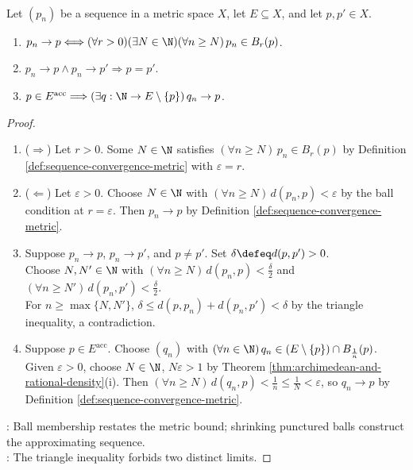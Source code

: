 \begin{theorem} \label{thm:metric-sequence-basic-properties} \\
Let $(p_n)$ be a sequence in a metric space $X$, let $E\subseteq X$, and let $p,p'\in X$.
\begin{enumerate}[label=(\roman*)]
\setlength{\itemsep}{0pt}
\item $p_n\to p\Longleftrightarrow (\forall r>0)(\exists N\in\N)(\forall n\geq N)\,p_n\in B_r(p)$.
\item $p_n\to p\land p_n\to p'\Longrightarrow p=p'$.
\item $p\in E^{\operatorname{acc}}\Longrightarrow(\exists q:\N\to E\setminus\{p\})\,q_n\to p$.
\end{enumerate}
\begin{proof}
\begin{enumerate}[label=(\roman*)]
\setlength{\itemsep}{0pt}
\item[$(i)$] ($\Rightarrow$) Let $r>0$. Some $N\in\N$ satisfies $(\forall n\geq N)\,p_n\in B_r(p)$ by Definition \ref{def:sequence-convergence-metric} with $\varepsilon=r$.
\item[$(i)$] ($\Leftarrow$) Let $\varepsilon>0$. Choose $N\in\N$ with $(\forall n\geq N)\,d(p_n,p)<\varepsilon$ by the ball condition at $r=\varepsilon$. Then $p_n\to p$ by Definition \ref{def:sequence-convergence-metric}.
\item[$(ii)$] Suppose $p_n\to p$, $p_n\to p'$, and $p\neq p'$. Set $\delta\defeq d(p,p')>0$.\\
Choose $N,N'\in\N$ with $(\forall n\geq N)\,d(p_n,p)<\frac{\delta}{2}$ and $(\forall n\geq N')\,d(p_n,p')<\frac{\delta}{2}$.\\
For $n\geq\max\{N,N'\}$, $\delta\leq d(p,p_n)+d(p_n,p')<\delta$ by the triangle inequality, a contradiction.
\item[$(iii)$] Suppose $p\in E^{\operatorname{acc}}$. Choose $(q_n)$ with $(\forall n\in\N)\,q_n\in(E\setminus\{p\})\cap B_{\frac{1}{n}}(p)$.\\
Given $\varepsilon>0$, choose $N\in\N$, $N\varepsilon>1$ by Theorem \ref{thm:archimedean-and-rational-density}(i). Then $(\forall n\geq N)\,d(q_n,p)<\frac{1}{n}\leq\frac{1}{N}<\varepsilon$, so $q_n\to p$ by Definition \ref{def:sequence-convergence-metric}.
\end{enumerate}
: Ball membership restates the metric bound; shrinking punctured balls construct the approximating sequence.\\
: The triangle inequality forbids two distinct limits.
\end{proof}
\end{theorem}

